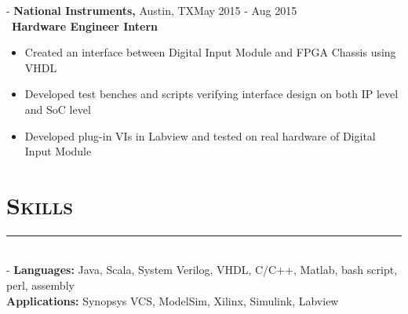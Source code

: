 \documentclass[12pt]{res}
\newcommand{\style}[1]{\color{Blue}\large\textsc{#1}}
\begin{document}
\begin{resume}
\vspace{-10pt}

 -\sectionwidth \resumewidth
{\textbf{National Instruments,}  Austin, TX\hfill May 2015 - Aug 2015} \hspace{-0.58in}\vspace{-0mm}\\\
  \textbf{Hardware Engineer Intern} \\
 \vspace{-14pt}
 \begin{itemize}[leftmargin=-0.1in]
  \item Created an interface between Digital Input Module and FPGA Chassis using VHDL\vspace{-5pt}
  \item Developed test benches and scripts verifying interface design on both IP level and SoC level \vspace{-5pt}
  \item Developed plug-in VIs in Labview and tested on real hardware of Digital Input Module\\
   \end{itemize}\vspace{-28pt}
   
   
\section{\style{Skills}}
\vspace{-10pt}
\rule{18cm}{0.5mm}\\
 -\sectionwidth \resumewidth
 \textbf{Languages:}  Java, Scala, System Verilog, VHDL, C/C++, Matlab, bash script, perl, assembly    \hfill \vspace{-0.5mm}\\
 \textbf{Applications:} Synopsys VCS,  ModelSim, Xilinx, Simulink, Labview\\%


\end{resume}
\end{document}

